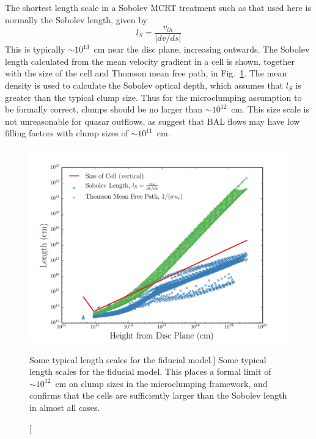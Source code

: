 The shortest length scale in a Sobolev MCRT treatment such as that used here
is normally the Sobolev length, given by 
\begin{equation}
l_S = \frac{v_{th}}{| dv/ds |}
\end{equation}
This is typically $\sim10^{13}$~cm near the disc plane, increasing outwards.
The Sobolev length calculated from the mean velocity gradient in a cell
is shown, together with the size of the cell
and Thomson mean free path, in Fig.~\ref{fig:length_scales}.
The mean density is used to calculate the Sobolev optical depth, 
which assumes that $l_S$ is greater than the typical clump size.
Thus for the microclumping assumption to be formally correct, 
clumps should be no larger than $\sim10^{12}$~cm.
This size scale is not unreasonable for quasar outflows, as
\cite{dekool1995} suggest that BAL flows may have low filling factors with
clump sizes of $\sim10^{11}$~cm.
\begin{figure} 
\centering
\includegraphics[width=1.0\textwidth]{figures/06-agnpaper/size_of_clumps.png}
\caption
[Some typical length scales for the fiducial model.]
{
Some typical length scales for the fiducial model. 
This places a formal limit of $\sim10^{12}$~cm on clump sizes 
in the microclumping framework, and confirms that the cells are sufficiently
larger than the Sobolev length in almost all cases.
}
\label{fig:length_scales}
\end{figure} 


